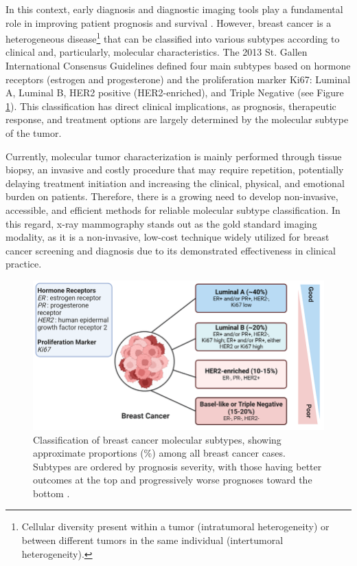 \documentclass[a4paper,10pt]{book}
\begin{document}
In this context, early diagnosis and diagnostic imaging tools play a fundamental role in improving patient prognosis and survival \cite{wang_early_2017}. However, breast cancer is a heterogeneous disease\footnote{Cellular diversity present within a tumor (intratumoral heterogeneity) or between different tumors in the same individual (intertumoral heterogeneity).} that can be classified into various subtypes according to clinical and, particularly, molecular characteristics. The 2013 St. Gallen International Consensus Guidelines \cite{goldhirsch_personalizing_2013} defined four main subtypes based on hormone receptors (estrogen and progesterone) and the proliferation marker Ki67: Luminal A, Luminal B, HER2 positive (HER2-enriched), and Triple Negative (see Figure \ref{fig:subtypes}). This classification has direct clinical implications, as prognosis, therapeutic response, and treatment options are largely determined by the molecular subtype of the tumor.

Currently, molecular tumor characterization is mainly performed through tissue biopsy, an invasive and costly procedure that may require repetition, potentially delaying treatment initiation and increasing the clinical, physical, and emotional burden on patients. Therefore, there is a growing need to develop non-invasive, accessible, and efficient methods for reliable molecular subtype classification. In this regard, x-ray mammography stands out as the gold standard imaging modality, as it is a non-invasive, low-cost technique widely utilized for breast cancer screening and diagnosis due to its demonstrated effectiveness in clinical practice.

\begin{figure}
	\centering
	\includegraphics[width=0.8\linewidth]{reports/assets/subtypes.png}
	\caption[Classification of breast cancer molecular subtypes.]{Classification of breast cancer molecular subtypes, showing approximate proportions (\%) among all breast cancer cases. Subtypes are ordered by prognosis severity, with those having better outcomes at the top and progressively worse prognoses toward the bottom \cite{harnessing_2024}.}
	\label{fig:subtypes}
\end{figure}
\end{document}
